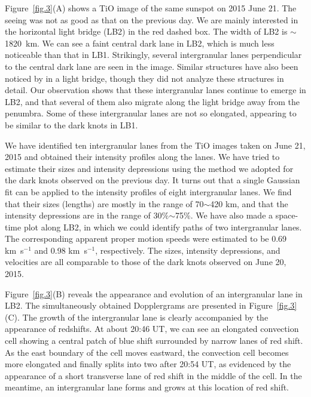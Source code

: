 \documentclass[preprint2]{aastex}
\begin{document}
\begin{figure*}
 \caption{(A) TiO image of NOAA AR 12371 taken at 20:01:23 UT on 2015 June 21. The red dashed box outlines the region shown in panels (B) \& (C) and Figure~\ref{fig.4}. (B) Image sequence of TiO showing the appearance and evolution of a transverse intergranular lane. (C) Similar to (B) but showing the Dopplergrams. Positive values (red color) represent downflows. The arrows in (B) \& (C) indicate the location of this intergranular lane.} \label{fig.3}
\end{figure*}


Figure~\ref{fig.3}(A) shows a TiO image of the same sunspot on 2015 June 21. The seeing was not as good as that on the previous day. We are mainly interested in the horizontal light bridge (LB2) in the red dashed box. The width of LB2 is $\sim$1820~km. We can see a faint central dark lane in LB2, which is much less noticeable than that in LB1. Strikingly, several intergranular lanes perpendicular to the central dark lane are seen in the image. Similar structures have also been noticed by \cite{Sobotka1994} in a light bridge, though they did not analyze these structures in detail. Our observation shows that these intergranular lanes continue to emerge in LB2, and that several of them also migrate along the light bridge away from the penumbra. Some of these intergranular lanes are not so elongated, appearing to be similar to the dark knots in LB1.


We have identified ten intergranular lanes from the TiO images taken on June 21, 2015 and obtained their intensity profiles along the lanes. We have tried to estimate their sizes and intensity depressions using the method we adopted for the dark knots observed on the previous day. It turns out that a single Gaussian fit can be applied to the intensity profiles of eight intergranular lanes. We find that their sizes (lengths) are mostly in the range of 70$\sim$420 km, and that the intensity depressions are in the range of 30\%$\sim$75\%. We have also made a space-time plot along LB2, in which we could identify paths of two intergranular lanes. The corresponding apparent proper motion speeds were estimated to be 0.69 km~s$^{-1}$ and 0.98 km~s$^{-1}$, respectively. The sizes, intensity depressions, and velocities are all comparable to those of the dark knots observed on June 20, 2015.

Figure~\ref{fig.3}(B) reveals the appearance and evolution of an intergranular lane in LB2. The simultaneously obtained Dopplergrams are presented in Figure~\ref{fig.3}(C). The growth of the intergranular lane is clearly accompanied by the appearance of redshifts. At about 20:46 UT, we can see an elongated convection cell showing a central patch of blue shift surrounded by narrow lanes of red shift. As the east boundary of the cell moves eastward, the convection cell becomes more elongated and finally splits into two after 20:54 UT, as evidenced by the appearance of a short transverse lane of red shift in the middle of the cell. In the meantime, an intergranular lane forms and grows at this location of red shift.
\end{document}
